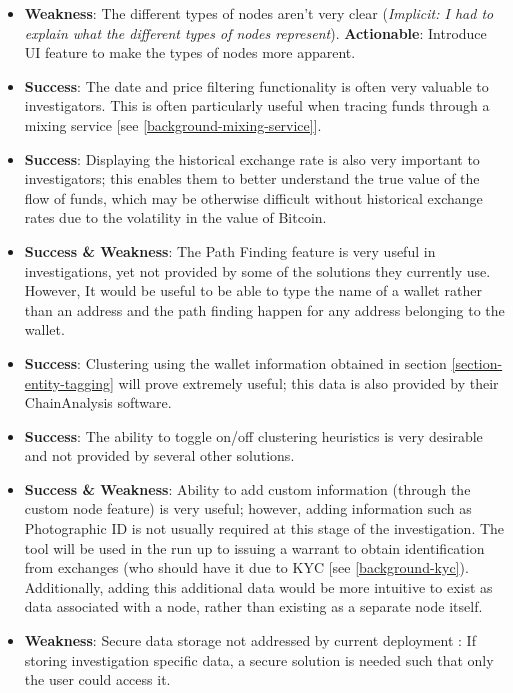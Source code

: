 \begin{itemize}
    \item \textbf{Weakness}: The different types of nodes aren't very clear (\textit{Implicit: I had to explain what the different types of nodes represent}). \textbf{Actionable}: Introduce UI feature to make the types of nodes more apparent. 
    \item \textbf{Success}: The date and price filtering functionality is often very valuable to investigators. This is often particularly useful when tracing funds through a mixing service [see \ref{background-mixing-service}]. 
    \item \textbf{Success}: Displaying the historical exchange rate is also very important to investigators; this enables them to better understand the true value of the flow of funds, which may be otherwise difficult without historical exchange rates due to the volatility in the value of Bitcoin. 
    \item \textbf{Success \& Weakness}: The Path Finding feature is very useful in investigations, yet not provided by some of the solutions they currently use. However, It would be useful to be able to type the name of a wallet rather than an address and the path finding happen for any address belonging to the wallet. 
    \item \textbf{Success}: Clustering using the wallet information obtained in section \ref{section-entity-tagging} will prove extremely useful; this data is also provided by their ChainAnalysis software. 
    \item \textbf{Success}: The ability to toggle on/off clustering heuristics is very desirable and not provided by several other solutions. 
    \item \textbf{Success \& Weakness}: Ability to add custom information (through the custom node feature) is very useful; however, adding information such as Photographic ID is not usually required at this stage of the investigation. The tool will be used in the run up to issuing a warrant to obtain identification from exchanges (who should have it due to KYC [see \ref{background-kyc}). Additionally, adding this additional data would be more intuitive to exist as data associated with a node, rather than existing as a separate node itself. 
    \item \textbf{Weakness}: Secure data storage not addressed by current deployment : If storing investigation specific data, a secure solution is needed such that only the user could access it. 
\end{itemize}

